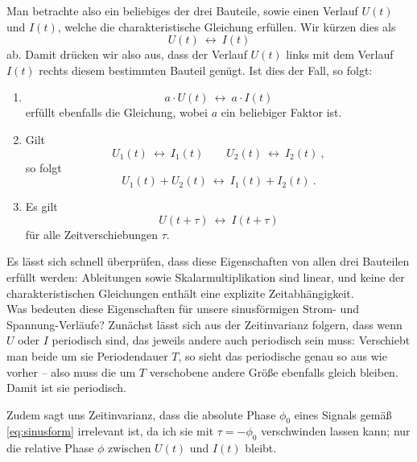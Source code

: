 \def\llra{~\longleftrightarrow~}
Man betrachte also ein beliebiges der drei Bauteile, sowie einen Verlauf $U(t)$ und $I(t)$, welche die charakteristische
Gleichung erfüllen. Wir kürzen dies als
$$U(t) \llra I(t)$$
ab. Damit drücken wir also aus, dass der Verlauf $U(t)$ links mit dem Verlauf $I(t)$ rechts diesem bestimmten Bauteil
genügt.
Ist dies der Fall, so folgt:
\begin{enumerate}[label=(\arabic*)]
    \item
        \[ a\cdot U(t) \llra a \cdot I(t) \]
        erfüllt ebenfalls die Gleichung, wobei $a$ ein beliebiger Faktor ist.
    \item Gilt
        \[ U_1(t) \llra I_1(t) \qquad U_2(t) \llra I_2(t) ~,\]
        so folgt
        \[ U_1(t) + U_2(t) \llra I_1(t) + I_2(t) ~. \]
    \item Es gilt
        \[ U(t+\tau) \llra I(t+\tau) \]
        für alle Zeitverschiebungen $\tau$.
\end{enumerate}

Es lässt sich schnell überprüfen, dass diese Eigenschaften von allen drei Bauteilen erfüllt werden: Ableitungen sowie
Skalarmultiplikation sind linear, und keine der charakteristischen Gleichungen enthält eine explizite Zeitabhängigkeit.
\\

Was bedeuten diese Eigenschaften für unsere sinusförmigen Strom- und Spannung-Verläufe? Zunächst lässt sich aus der
Zeitinvarianz folgern, dass wenn $U$ oder $I$ periodisch sind, das jeweils andere auch periodisch sein muss: Verschiebt
man beide um sie Periodendauer $T$, so sieht das periodische genau so aus wie vorher -- also muss die um $T$ verschobene
andere Größe ebenfalls gleich bleiben. Damit ist sie periodisch.

Zudem sagt uns Zeitinvarianz, dass die absolute Phase $\phi_0$ eines Signals gemäß \eqref{eq:sinusform} irrelevant ist,
da ich sie mit $\tau = -\phi_0$ verschwinden lassen kann; nur die relative Phase $\phi$ zwischen $U(t)$ und $I(t)$
bleibt.

